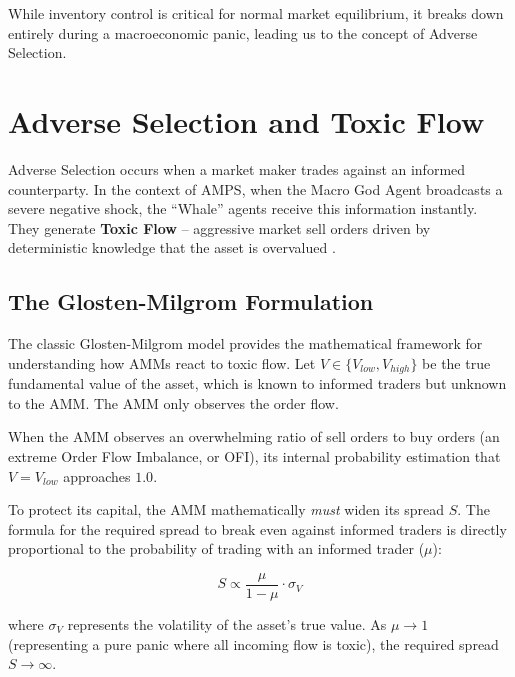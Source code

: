 While inventory control is critical for normal market equilibrium, it breaks down entirely during a macroeconomic panic, leading us to the concept of Adverse Selection.

\section{Adverse Selection and Toxic Flow}

Adverse Selection occurs when a market maker trades against an informed counterparty. In the context of AMPS, when the Macro God Agent broadcasts a severe negative shock, the ``Whale'' agents receive this information instantly. They generate \textbf{Toxic Flow} -- aggressive market sell orders driven by deterministic knowledge that the asset is overvalued \cite{glosten1985bid}.

\subsection{The Glosten-Milgrom Formulation}

The classic Glosten-Milgrom model \cite{glosten1985bid} provides the mathematical framework for understanding how AMMs react to toxic flow. Let $V \in \{V_{low}, V_{high}\}$ be the true fundamental value of the asset, which is known to informed traders but unknown to the AMM. The AMM only observes the order flow.

When the AMM observes an overwhelming ratio of sell orders to buy orders (an extreme Order Flow Imbalance, or OFI), its internal probability estimation that $V = V_{low}$ approaches $1.0$.

To protect its capital, the AMM mathematically \textit{must} widen its spread $S$. The formula for the required spread to break even against informed traders is directly proportional to the probability of trading with an informed trader ($\mu$):

\begin{equation}
    S \propto \frac{\mu}{1 - \mu} \cdot \sigma_V
\end{equation}

where $\sigma_V$ represents the volatility of the asset's true value. As $\mu \to 1$ (representing a pure panic where all incoming flow is toxic), the required spread $S \to \infty$. 

